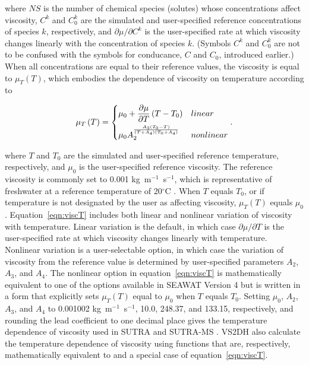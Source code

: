 \noindent where $NS$ is the number of chemical species (solutes) whose concentrations affect viscosity, $C^k$ and $C_{0}^k$ are the simulated and user-specified reference concentrations of species $k$, respectively, and $\partial \mu / \partial C^k$ is the user-specified rate at which viscosity changes linearly with the concentration of species $k$. (Symbols $C^k$ and $C_{0}^k$ are not to be confused with the symbols for conducance, $C$ and $C_0$, introduced earlier.) When all concentrations are equal to their reference values, the viscosity is equal to $\mu_T \left ( T \right )$, which embodies the dependence of viscosity on temperature according to

\begin{align}
	\label{eqn:viscT}
	 \mu_T \left ( T \right ) = \begin{dcases}
		\mu_{0} + \frac{\partial \mu} {\partial T} \left ( T - T_{0}\right ) & linear \\
		\mu_{0} A_2^{\frac{A_3 \left ( T_0 - T \right )} {\left ( T + A_4 \right ) \left ( T_0 + A_4 \right ) }} & nonlinear
	\end{dcases} .
\end{align}

\noindent where $T$ and $T_{0}$ are the simulated and user-specified reference temperature, respectively, and $\mu_{0}$ is the user-specified reference viscosity. The reference viscosity is commonly set to 0.001 kg~m$^{-1}$~s$^{-1}$, which is representative of freshwater at a reference temperature of 20$^{\circ}$C \citep[Table 11.1]{maidment1993}. When $T$ equals $T_{0}$, or if temperature is not designated by the user as affecting viscosity, $\mu_T \left ( T \right )$ equals $\mu_{0}$. Equation~\ref{eqn:viscT} includes both linear and nonlinear variation of viscosity with temperature. Linear variation is the default, in which case $\partial \mu / \partial T$ is the user-specified rate at which viscosity changes linearly with temperature. Nonlinear variation is a user-selectable option, in which case the variation of viscosity from the reference value is determined by user-specified parameters $A_2$, $A_3$, and $A_4$. The nonlinear option in equation~\ref{eqn:viscT} is mathematically equivalent to one of the options available in SEAWAT Version 4 \citep[equation 18]{langevin2002seawat} but is written in a form that explicitly sets $\mu_T \left ( T \right )$ equal to $\mu_{0}$ when $T$ equals $T_{0}$. Setting $\mu_0$, $A_2$, $A_3$, and $A_4$ to 0.001002 kg~m$^{-1}$~s$^{-1}$, 10.0, 248.37, and 133.15, respectively, and rounding the lead coefficient to one decimal place gives the temperature dependence of viscosity used in SUTRA \citep{voss1984sutra} and SUTRA-MS \citep{hughes2004}. VS2DH \citep{healy1996} also calculate the temperature dependence of viscosity using functions that are, respectively, mathematically equivalent to and a special case of equation~\ref{eqn:viscT}.

